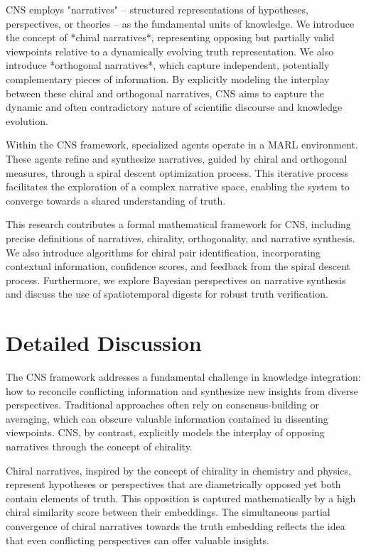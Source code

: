 \documentclass[12pt, a4paper]{article}
\begin{document}
CNS employs "narratives" – structured representations of hypotheses, perspectives, or theories – as the fundamental units of knowledge.  We introduce the concept of *chiral narratives*, representing opposing but partially valid viewpoints relative to a dynamically evolving truth representation.  We also introduce *orthogonal narratives*, which capture independent, potentially complementary pieces of information.  By explicitly modeling the interplay between these chiral and orthogonal narratives, CNS aims to capture the dynamic and often contradictory nature of scientific discourse and knowledge evolution.

Within the CNS framework, specialized agents operate in a MARL environment.  These agents refine and synthesize narratives, guided by chiral and orthogonal measures, through a spiral descent optimization process. This iterative process facilitates the exploration of a complex narrative space, enabling the system to converge towards a shared understanding of truth.

This research contributes a formal mathematical framework for CNS, including precise definitions of narratives, chirality, orthogonality, and narrative synthesis.  We also introduce algorithms for chiral pair identification, incorporating contextual information, confidence scores, and feedback from the spiral descent process.  Furthermore, we explore Bayesian perspectives on narrative synthesis and discuss the use of spatiotemporal digests for robust truth verification.

\section{Detailed Discussion}

The CNS framework addresses a fundamental challenge in knowledge integration: how to reconcile conflicting information and synthesize new insights from diverse perspectives.  Traditional approaches often rely on consensus-building or averaging, which can obscure valuable information contained in dissenting viewpoints.  CNS, by contrast, explicitly models the interplay of opposing narratives through the concept of chirality.

Chiral narratives, inspired by the concept of chirality in chemistry and physics, represent hypotheses or perspectives that are diametrically opposed yet both contain elements of truth.  This opposition is captured mathematically by a high chiral similarity score between their embeddings.  The simultaneous partial convergence of chiral narratives towards the truth embedding reflects the idea that even conflicting perspectives can offer valuable insights.
\end{document}
